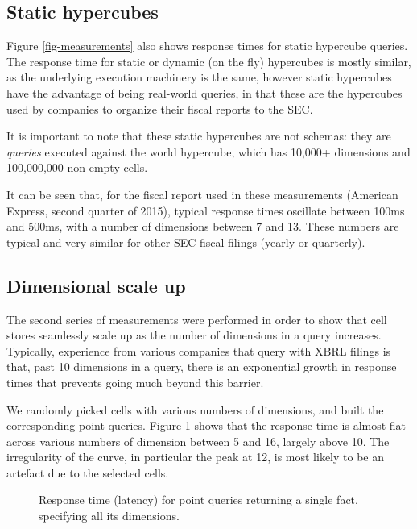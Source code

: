 \documentclass{acm_proc_article-sp}
\begin{document}
\subsection{Static hypercubes}

Figure \ref{fig-measurements} also shows response times for static hypercube queries. The response time for static or dynamic (on the fly) hypercubes is mostly similar, as the underlying execution machinery is the same, however static hypercubes have the advantage of being real-world queries, in that these are the hypercubes used by companies to organize their fiscal reports to the SEC.

It is important to note that these static hypercubes are not schemas: they are \emph{queries} executed against the world hypercube, which has 10,000+ dimensions and 100,000,000 non-empty cells.

It can be seen that, for the fiscal report used in these measurements (American Express, second quarter of 2015), typical response times oscillate between 100ms and 500ms, with a number of dimensions between 7 and 13. These numbers are typical and very similar for other SEC fiscal filings (yearly or quarterly).

\subsection{Dimensional scale up}

The second series of measurements were performed in order to show that cell stores seamlessly scale up as the number of dimensions in a query increases. Typically, experience from various companies that query with XBRL filings is that, past 10 dimensions in a query, there is an exponential growth in response times that prevents going much beyond this barrier.

We randomly picked cells with various numbers of dimensions, and built the corresponding point queries. Figure \ref{figure-dimension-scaleup} shows that the response time is almost flat across various numbers of dimension between 5 and 16, largely above 10. The irregularity of the curve, in particular the peak at 12, is most likely to be an artefact due to the selected cells.

\begin{figure}
\caption{Response time (latency) for point queries returning a single fact, specifying all its dimensions.}
\label{figure-dimension-scaleup}
\end{figure}
\end{document}
